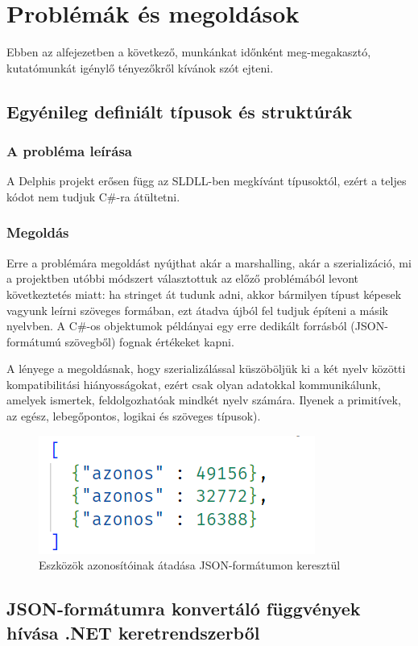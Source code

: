 \documentclass[tocnopagenum]{thesis-ekf}
\begin{document}
	\section{Problémák és megoldások}
	Ebben az alfejezetben a következő, munkánkat időnként meg-megakasztó, kutatómunkát igénylő tényezőkről kívánok szót ejteni.
	\subsection{Egyénileg definiált típusok és struktúrák}
	\subsubsection{A probléma leírása} A Delphis projekt erősen függ az SLDLL-ben megkívánt típusoktól, ezért a teljes kódot nem tudjuk C\#-ra átültetni.
	\subsubsection{Megoldás} 
	Erre a problémára megoldást nyújthat akár a marshalling, akár a szerializáció, mi a projektben utóbbi módszert választottuk az előző problémából levont következtetés miatt: ha stringet át tudunk adni, akkor bármilyen típust képesek vagyunk leírni szöveges formában, ezt átadva újból fel tudjuk építeni a másik nyelvben. A C\#-os objektumok példányai egy erre dedikált forrásból (JSON-formátumú szövegből) fognak értékeket kapni.
	
	A lényege a megoldásnak, hogy szerializálással küszöböljük ki a két nyelv közötti kompatibilitási hiányosságokat, ezért csak olyan adatokkal kommunikálunk, amelyek ismertek, feldolgozhatóak mindkét nyelv számára. Ilyenek a primitívek, az egész, lebegőpontos, logikai és szöveges típusok).
	
	\begin{figure}[H]
		\centering
		\includegraphics[scale=0.89]{json_szerializalas_azonositok}
		\caption{Eszközök azonosítóinak átadása JSON-formátumon keresztül}
		\label{json_azonositok}
	\end{figure}

	\subsection{JSON-formátumra konvertáló függvények hívása .NET keretrendszerből}
\end{document}
